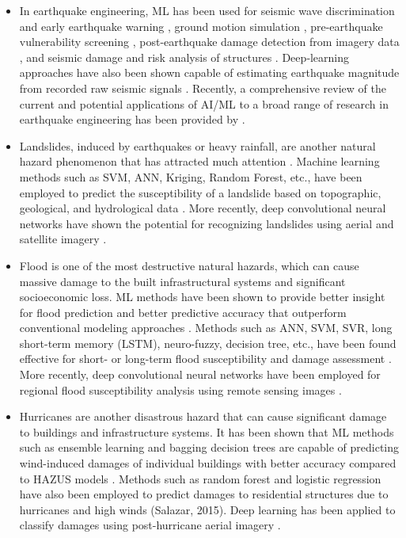 \begin{itemize}
 \item In earthquake engineering, ML has been used for seismic wave discrimination and early earthquake warning \citep{li2018machine}, ground motion simulation \citep{alimoradi2015machinelearning}, pre-earthquake vulnerability screening \citep{yu2019building}, post-earthquake damage detection from imagery data \citep{cooner2016detection,bai2017machine}, and seismic damage and risk analysis of structures \citep{gidaris2015kriging}. Deep‐learning approaches have also been shown capable of estimating earthquake magnitude from recorded raw seismic signals \citep{mousavi2020machine}. Recently, a comprehensive review of the current and potential applications of AI/ML to a broad range of research in earthquake engineering has been provided by \citet{xie2020promise}. 
 \item Landslides, induced by earthquakes or heavy rainfall, are another natural hazard phenomenon that has attracted much attention \citep{dou2014gisbased}. Machine learning methods such as SVM, ANN, Kriging, Random Forest, etc., have been employed to predict the susceptibility of a landslide based on topographic, geological, and hydrological data \citep{yao2008landslide,goetz2015evaluating,pham2016comparative}. More recently, deep convolutional neural networks have shown the potential for recognizing landslides using aerial and satellite imagery \citep{ghorbanzadeh2019evaluation}.
 \item Flood is one of the most destructive natural hazards, which can cause massive damage to the built infrastructural systems and significant socioeconomic loss. ML methods have been shown to provide better insight for flood prediction and better predictive accuracy that outperform conventional modeling approaches \citep{abbot2014input,mosavi2018flood}. Methods such as ANN, SVM, SVR, long short-term memory (LSTM), neuro-fuzzy, decision tree, etc., have been found effective for short- or long-term flood susceptibility and damage assessment \citep{kim2016realtime,gizaw2016regional,resch2018combining,arabi2019urban,le2019application}. More recently, deep convolutional neural networks have been employed for regional flood susceptibility analysis using remote sensing images \citep{gebrehiwot2019deep,li2019urban,wang2020flood}. 
 \item Hurricanes are another disastrous hazard that can cause significant damage to buildings and infrastructure systems. It has been shown that ML methods such as ensemble learning and bagging decision trees are capable of predicting wind-induced damages of individual buildings with better accuracy compared to HAZUS models \citep{subramanian2013constructing}. Methods such as random forest and logistic regression have also been employed to predict damages to residential structures due to hurricanes and high winds (Salazar, 2015). Deep learning has been applied to classify damages using post-hurricane aerial imagery \citep{thomas2011robust,li2018semisupervised, kersbergen2018automated}. 
\end{itemize}

